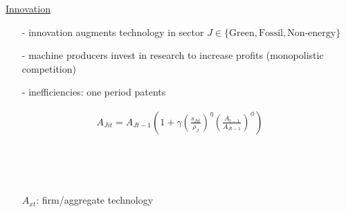 \documentclass[11pt,aspectratio=169]{beamer}
\begin{document}
\begin{frame}{\hyperlink{modma}{Innovation}}
	\hypertarget{backinnov}{}
	\vspace{-2mm}
	\begin{itemize}[<+->]
		\item[-] innovation augments technology in sector $J\in\{\text{Green},\text{Fossil},\text{Non-energy}\}$ \vspace{-1mm}
		\item[-] machine producers invest in research to increase profits \small{(monopolistic competition)}
		\vspace{-1mm}
		\normalsize
		\item[-] inefficiencies: one period patents
	\end{itemize}
\pause
	\vspace{-2.5mm}
	\large
	\begin{align*}
		A_{Jit}={A_{Jt-1}}\left(1+\gamma\left(\frac{s_{Jit}}{\rho_J}\right)^\eta\left(\frac{A_{t-1}}{A_{Jt-1}}\right)^\phi\right)
	\end{align*}
	\normalsize
	\vspace{-1.4mm}
	\begin{enumerate}
		\item[] %
	\item[] \  %
	\item[] \  %
\end{enumerate}
\small
\vspace{4mm}
\hspace{-2mm}
\begin{minipage}[t!]{0.43\textwidth}
	\vspace{0mm}
	\begin{itemize}
		\item[] $A_{xt}$: firm/aggregate technology

\end{itemize}
\end{minipage}
\end{frame}
\end{document}
